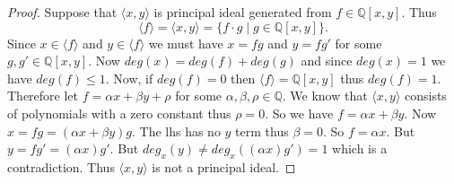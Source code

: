 \begin{proof}
    Suppose that $\langle x, y \rangle$ is principal ideal generated from $f \in \mathbb{Q}[x, y]$.
    Thus 
    \[\langle f \rangle = \langle x, y \rangle = \{f \cdot g \mid g \in \mathbb{Q}[x, y]\}.\]
    Since $x \in \langle f \rangle$ and $y \in \langle f \rangle$
        we must have $x = f g$ and $y = f g'$ for some $g, g' \in \mathbb{Q}[x, y]$.
    Now $deg(x) = deg(f) + deg(g)$ and since $deg(x) = 1$ we have $deg(f) \le 1$.
    Now, if $deg(f) = 0$ then $\langle f \rangle = \mathbb{Q}[x,  y]$ thus $deg(f) = 1$.
    Therefore let $f = \alpha x + \beta y + \rho$ for some $\alpha, \beta, \rho \in \mathbb{Q}$.
    We know that $\langle x, y \rangle$ consists of polynomials with a zero constant thus $\rho = 0$.
    So we have $f = \alpha x + \beta y$.
    Now $x = fg = (\alpha x + \beta y)g$. The lhs has no $y$ term thus $\beta = 0$.
    So $f = \alpha x$. But $y = f g' = (\alpha x) g'$.
    But $deg_x(y) \ne deg_x((\alpha x) g') = 1$ which is a contradiction.
    Thus $\langle x, y \rangle$ is not a principal ideal.
\end{proof}

